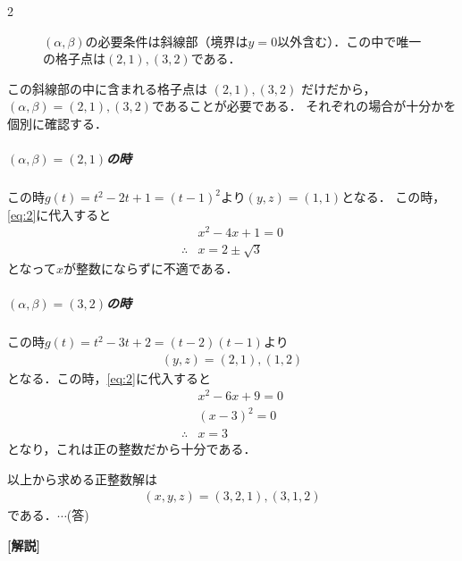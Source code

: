 \documentclass[../../main.tex]{subfiles}
\begin{document}
\begin{multicols}{2}
\begin{figure}[H]
    \caption{$(\alpha,\beta)$の必要条件は斜線部（境界は$y=0$以外含む）．この中で唯一の格子点は$(2,1), (3,2)$である．}
    \label{2001-1:fig:1}
  \end{figure}

  この斜線部の中に含まれる格子点は $(2,1), (3,2)$ だけだから，
  $(\alpha,\beta)=(2,1), (3,2)$であることが必要である．
  それぞれの場合が十分かを個別に確認する．

  \subparagraph{$(\alpha,\beta)=(2,1)$の時}

  この時$g(t)=t^2-2t+1=(t-1)^2$より$(y,z)=(1,1)$となる．
  この時，\cref{eq:2}に代入すると
  \begin{align}
    & x^2 - 4x + 1 = 0 \\
    \therefore
    & x = 2 \pm \sqrt{3}
  \end{align}
  となって$x$が整数にならずに不適である．

  \subparagraph{$(\alpha,\beta)=(3,2)$の時}

  この時$g(t)=t^2-3t+2=(t-2)(t-1)$より
  \begin{align}
    (y,z)=(2,1),(1,2)
  \end{align}
  となる．この時，\cref{eq:2}に代入すると
  \begin{align}
    & x^2-6x+9=0 \\
    & (x-3)^2=0  \\
    \therefore & x=3
  \end{align}
  となり，これは正の整数だから十分である．
  \casesend

  以上から求める正整数解は
  \begin{align}
    (x,y,z)=(3,2,1), (3,1,2)
  \end{align}
  である．$\cdots$(答)

  {\bf [解説]}

  \newpage
\end{multicols}
\end{document}
